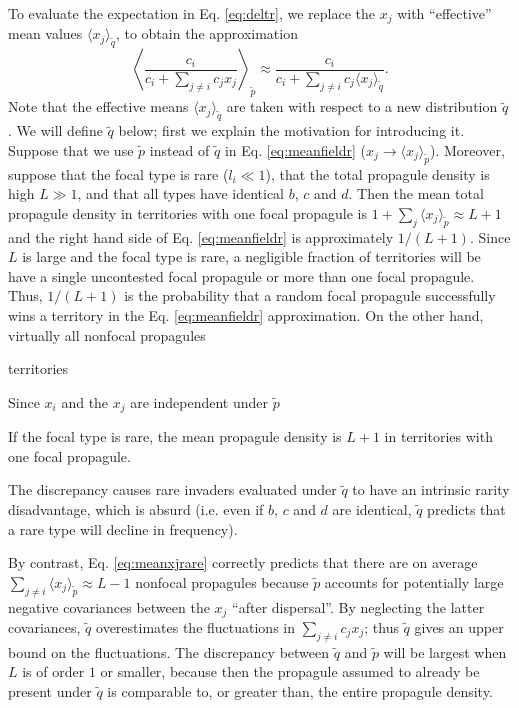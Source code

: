 \documentclass[12pt]{article}
\begin{document}
To evaluate the expectation in Eq. \eqref{eq:deltr}, we replace the $x_j$ with  ``effective'' mean values $\langle x_j\rangle_{\tilde{q}}$, to obtain the approximation
\begin{equation}
\left\langle\frac{c_i}{c_i +\sum_{j\neq i} c_j x_j}\right\rangle_{\tilde{p}}\approx \frac{c_i}{c_i +\sum_{j\neq i} c_j \langle x_j\rangle_{\tilde{q}}}.\label{eq:meanfieldr}
\end{equation}
Note that the effective means $\langle x_j\rangle_{\tilde{q}}$ are taken with respect to a new distribution $\tilde{q}$. We will define $\tilde{q}$ below; first we explain the motivation for introducing it. Suppose that we use $\tilde{p}$ instead of $\tilde{q}$ in Eq. \eqref{eq:meanfieldr} ($x_j\rightarrow \langle x_j\rangle_{\tilde{p}}$). Moreover, suppose that the focal type is rare ($l_i\ll 1$), that the total propagule density is high $L\gg 1$, and that all types have identical $b$, $c$ and $d$. Then the mean total propagule density in territories with one focal propagule is $1+\sum_j \langle x_j\rangle_{\tilde{p}}\approx L+1$ and the right hand side of Eq. \eqref{eq:meanfieldr} is approximately $1/(L+1)$. Since $L$ is large and the focal type is rare, a negligible fraction of territories will be have a single uncontested focal propagule or more than one focal propagule. Thus, $1/(L+1)$ is the probability that a random focal propagule successfully wins a territory in the Eq. \eqref{eq:meanfieldr} approximation. On the other hand, virtually all nonfocal propagules 

 territories

\label{eq:meanfieldr} 

 

 
Since $x_i$ and the $x_j$ are independent under $\tilde{p}$

If the focal type is rare, the mean propagule density is $L+1$ in territories with one focal propagule. 


The discrepancy causes rare invaders evaluated under $\tilde{q}$ to have an intrinsic rarity disadvantage, which is absurd (i.e. even if $b$, $c$ and $d$ are identical, $\tilde{q}$ predicts that a rare type will decline in frequency). 

By contrast, Eq. \eqref{eq:meanxjrare} correctly predicts that there are on average $\sum_{j\neq i}\langle x_j \rangle_{\tilde{p}}\approx L-1$ nonfocal propagules because $\tilde{p}$ accounts for potentially large negative covariances between the $x_j$ ``after dispersal''. By neglecting the latter covariances, $\tilde{q}$ overestimates the fluctuations in $\sum_{j\neq i} c_j x_j$; thus $\tilde{q}$ gives an upper bound on the fluctuations. The discrepancy between $\tilde{q}$ and $\tilde{p}$ will be largest when $L$ is of order $1$ or smaller, because then the propagule assumed to already be present under $\tilde{q}$ is comparable to, or greater than, the entire propagule density.
\end{document}
